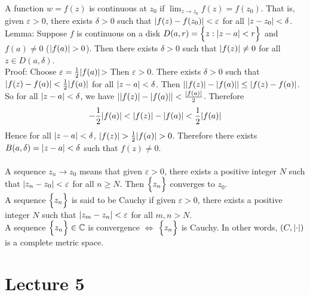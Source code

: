 \documentclass[12pt]{article}
\begin{document}
A function $w = f(z)$ is continuous at $z_0$ if $\lim_{z \to z_0} f(z) = f(z_0)$. That is, given $\varepsilon > 0$, there exists $\delta > 0$ such that $\abs{f(z) - f(z_0)} < \varepsilon$ for all $\abs{z - z_0} < \delta$. \\
Lemma: Suppose $f$ is continuous on a disk $D(a,r) = \Big\{  z : \abs{z - a} < r \Big\}$ and $f(a) \neq 0$ ($\abs{f(a)} > 0$). Then there exists $\delta > 0$ such that $\abs{f(z)} \neq 0$ for all $z \in D(a, \delta)$. \\
Proof: Choose $\varepsilon = \frac{1}{2} \abs{f(a)}$> Then $\varepsilon > 0$. There exists $\delta > 0$ such that $\abs{f(z) - f(a)} < \frac{1}{2}\abs{f(a)}$ for all $\abs{z - a} < \delta$. Then $\abs{ \abs{f(z)} - \abs{f(a)} } \leq \abs{f(z) - f(a)}$. So for all $\abs{z -a} < \delta$, we have $\abs{ \abs{f(z)} - \abs{f(a)} } < \frac{\abs{f(a)}}{2}$. Therefore $$ -\frac{1}{2}\abs{f(a)} < \abs{f(z)} - \abs{f(a)} < \frac{1}{2}\abs{f(a)} $$
Hence for all $\abs{z -a} < \delta$, $\abs{f(z)}  > \frac{1}{2}\abs{f(a)} > 0$. Therefore there exists $B(a,\delta) = \abs{z - a} < \delta$ such that $f(z) \neq 0$. \\~\\
A sequence $z_n \to z_0$ means that given $\varepsilon > 0$, there exists a positive integer $N$ such that $\abs{z_n - z_0} < \varepsilon$ for all $n \geq N$. Then $\Big\{ z_n \Big\}$ converges to $z_0$. \\
A sequence $\Big\{ z_n \Big\}$ is said to be Cauchy if given $\varepsilon > 0$, there exists a positive integer $N$ such that $\abs{z_m - z_n} < \varepsilon$ for all $m,n > N$. \\
A sequence $\Big\{ z_n \Big\} \in \mathbb{C}$ is convergence $\iff$ $\Big\{ z_n \Big\}$ is Cauchy. In other words, $(C, \abs{\cdot})$ is a complete metric space. 

\section{Lecture 5} 
\end{document}
